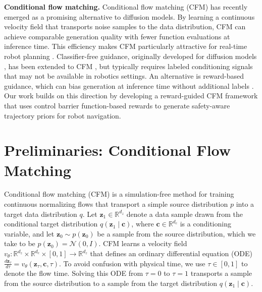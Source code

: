 \documentclass[letterpaper,10 pt,conference]{ieeeconf}
\begin{document}
\noindent\textbf{Conditional flow matching.}
Conditional flow matching (CFM) \cite{LipmanChenEtAl2023} has recently emerged as a promising alternative to diffusion models.
By learning a continuous velocity field that transports noise samples to the data distribution, CFM can achieve comparable generation quality with fewer function evaluations at inference time.
This efficiency makes CFM particularly attractive for real-time robot planning \cite{ChisariHeppertEtAl2024,YeGombolay2024}. 
Classifier-free guidance, originally developed for diffusion models \cite{HoSalimans2021}, has been extended to CFM \cite{ZhengLeEtAl2023}, but typically requires labeled conditioning signals that may not be available in robotics settings.
An alternative is reward-based guidance, which can bias generation at inference time without additional labels \cite{JannerDuEtAl2022}.
Our work builds on this direction by developing a reward-guided CFM framework that uses control barrier function-based rewards to generate safety-aware trajectory priors for robot navigation.



\section{Preliminaries: Conditional Flow Matching} \label{sec:preliminaries}

Conditional flow matching (CFM) \cite{LipmanChenEtAl2023} is a simulation-free method for training continuous normalizing flows \cite{ChenRubanovaEtAl2018} that transport a simple source distribution $p$ into a target data distribution $q$.
Let $\mathbf{z}_1 \in \mathbb{R}^{d_z}$ denote a data sample drawn from the conditional target distribution $q(\mathbf{z}_1\mid\mathbf{c})$, where $\mathbf{c} \in \mathbb{R}^{d_c}$ is a conditioning variable, and let $\mathbf{z}_0 \sim p(\mathbf{z}_0)$ be a sample from the source distribution, which we take to be $p(\mathbf{z}_0)=\mathcal{N}(0,I)$.
CFM learns a velocity field $v_\theta: \mathbb{R}^{d_z} \times \mathbb{R}^{d_c} \times [0,1] \rightarrow \mathbb{R}^{d_z}$
that defines an ordinary differential equation (ODE) $\frac{d\mathbf{z}_\tau}{d\tau}=v_\theta(\mathbf{z}_\tau,\mathbf{c},\tau)$. 
To avoid confusion with physical time, we use $\tau\in[0,1]$ to denote the flow time.
Solving this ODE from $\tau = 0$ to $\tau = 1$ transports a sample from the source distribution to a sample from the target distribution $q(\mathbf{z}_1\mid\mathbf{c})$.
\end{document}
